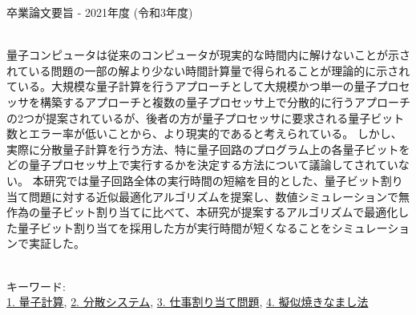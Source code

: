 卒業論文要旨 - 2021年度 (令和3年度)
\begin{center}
\begin{large}
\end{large}
\end{center}

~ \\

量子コンピュータは従来のコンピュータが現実的な時間内に解けないことが示されている問題の一部の解より少ない時間計算量で得られることが理論的に示されている。大規模な量子計算を行うアプローチとして大規模かつ単一の量子プロセッサを構築するアプローチと複数の量子プロセッサ上で分散的に行うアプローチの2つが提案されているが、後者の方が量子プロセッサに要求される量子ビット数とエラー率が低いことから、より現実的であると考えられている。
しかし、実際に分散量子計算を行う方法、特に量子回路のプログラム上の各量子ビットをどの量子プロセッサ上で実行するかを決定する方法について議論してされていない。
本研究では量子回路全体の実行時間の短縮を目的とした、量子ビット割り当て問題に対する近似最適化アルゴリズムを提案し、数値シミュレーションで無作為の量子ビット割り当てに比べて、本研究が提案するアルゴリズムで最適化した量子ビット割り当てを採用した方が実行時間が短くなることをシミュレーションで実証した。

~ \\
キーワード:\\
\underline{1. 量子計算},
\underline{2. 分散システム},
\underline{3. 仕事割り当て問題},
\underline{4. 擬似焼きなまし法}
\begin{flushright}
\dept \\
\author
\end{flushright}
